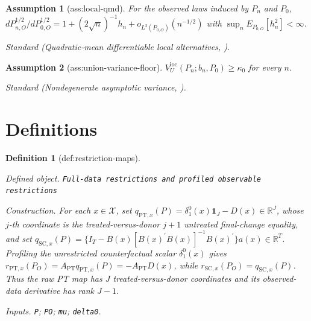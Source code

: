 \documentclass{article}
\newtheorem{assumption}{Assumption}
\newtheorem{definition}{Definition}
\begin{document}
\begin{assumption}[ass:local-qmd]\label{ass:local-qmd}
For the observed laws induced by \(P_n\) and \(P_0\), \(dP_{n,O}^{1/2}/dP_{0,O}^{1/2}=1+(2\sqrt n)^{-1}h_n+o_{L^2(P_{0,O})}(n^{-1/2})\) with \(\sup_nE_{P_{0,O}}[h_n^2]<\infty\).
\par\smallskip\noindent\emph{Standard} (Quadratic-mean differentiable local alternatives, \cite{VanDerVaart1998}).
\end{assumption}

\begin{assumption}[ass:union-variance-floor]\label{ass:union-variance-floor}
\(V_U^{\mathrm{loc}}(P_n;b_n,P_0)\ge\kappa_0\) for every \(n\).
\par\smallskip\noindent\emph{Standard} (Nondegenerate asymptotic variance, \cite{ChernozhukovChetverikovKato2016}).
\end{assumption}

\section{Definitions}

\begin{definition}[def:restriction-maps]\label{def:restriction-maps}
\par\smallskip\noindent\emph{Defined object.} \texttt{Full-\allowbreak{}data restrictions and profiled observable restrictions}
\par\smallskip\noindent\emph{Construction.} For each \(x\in\mathcal X\), set \(q_{\mathrm{PT},x}(P)=\delta_1^0(x)\mathbf 1_J-D(x)\in\mathbb R^J\), whose \(j\)-th coordinate is the treated-versus-donor \(j+1\) untreated final-change equality, and set \(q_{\mathrm{SC},x}(P)=\{I_T-B(x)[B(x)^{\prime}B(x)]^{-1}B(x)^{\prime}\}a(x)\in\mathbb R^T\). Profiling the unrestricted counterfactual scalar \(\delta_1^0(x)\) gives \(r_{\mathrm{PT},x}(P_O)=A_{\mathrm{PT}}q_{\mathrm{PT},x}(P)=-A_{\mathrm{PT}}D(x)\), while \(r_{\mathrm{SC},x}(P_O)=q_{\mathrm{SC},x}(P)\). Thus the raw PT map has \(J\) treated-versus-donor coordinates and its observed-data derivative has rank \(J-1\).
\par\smallskip\noindent\emph{Inputs.} \texttt{P}; \texttt{PO}; \texttt{mu}; \texttt{delta0}.
\end{definition}
\end{document}
